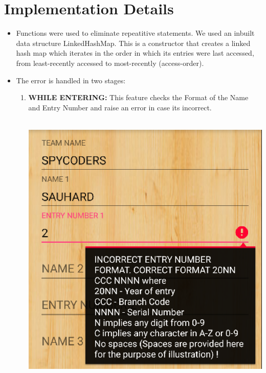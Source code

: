 \documentclass[12pt]{article}
\begin{document}
\section{Implementation Details}

\begin{itemize}
\item 
Functions were used to eliminate repeatitive statements.
We used an inbuilt data structure LinkedHashMap. This is a  constructor that creates a linked hash map which iterates in the order in which its entries were last accessed, from least-recently accessed to most-recently (access-order). 
\item The error is handled in two stages: 
\begin{enumerate}
\item \textbf{WHILE ENTERING:} This feature checks the Format of the Name and Entry Number and raise an error in case its incorrect.
\\
            \\
            \begin{minipage}{\linewidth}
	        \centering
	        \includegraphics[scale=.7]{WRONG_ENTRY_NUM.png}
            \end{minipage}
            \\

\end{enumerate}
\end{itemize}
\end{document}
